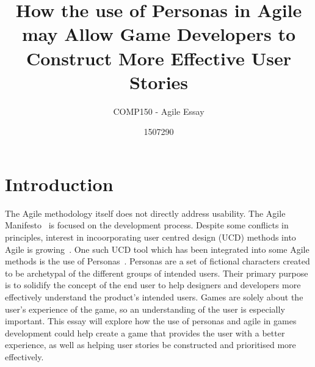 \documentclass{scrartcl}
\title{How the use of Personas in Agile may Allow Game Developers to Construct More Effective User Stories}
\subtitle{COMP150 - Agile Essay}
\author{1507290}
\begin{document}
\maketitle


\section{Introduction}
The Agile methodology itself does not directly address usability. The Agile Manifesto~\cite{} is focused on the development process. Despite some conflicts in principles, interest in incoorporating user centred design (UCD) methods into Agile is growing~\cite{haikara:extending}. One such UCD tool which has been integrated into some Agile methods is the use of Personas~\cite{caballero:persona}. Personas are a set of fictional characters created to be archetypal of the different groups of intended users. Their primary purpose is to solidify the concept of the end user to help designers and developers more effectively understand the product's intended users. 
Games are solely about the user's experience of the game, so an understanding of the user is especially important. This essay will explore how the use of personas and agile in games development could help create a game that provides the user with a better experience, as well as helping user stories be constructed and prioritised more effectively.

\end{document}
